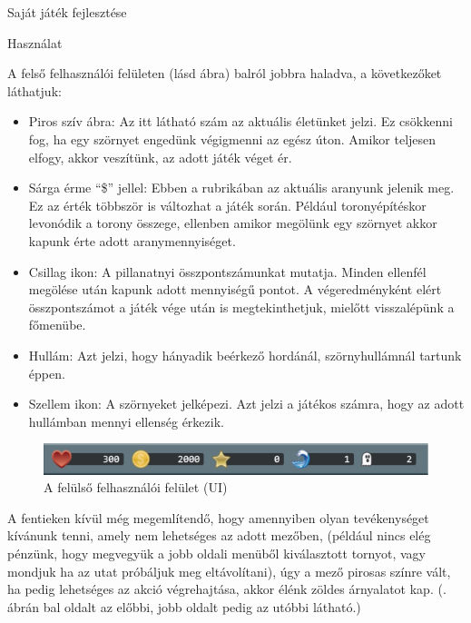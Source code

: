 \begin{MyChapter}{Saját játék fejlesztése}
\begin{MySection}{Használat}
	
		A felső felhasználói felületen (lásd  ábra) balról jobbra haladva, a következőket láthatjuk:
		
		\begin{itemize}
			\item Piros szív ábra: Az itt látható szám az aktuális életünket jelzi. Ez csökkenni fog, ha egy szörnyet engedünk végigmenni az egész úton. Amikor teljesen elfogy, akkor veszítünk, az adott játék véget ér.
			
			\item Sárga érme ``\$'' jellel: Ebben a rubrikában az aktuális aranyunk jelenik meg. Ez az érték többször is változhat a játék során. Például toronyépítéskor levonódik a torony összege, ellenben amikor megölünk egy szörnyet akkor kapunk érte adott aranymennyiséget.
			
			\item Csillag ikon: A pillanatnyi összpontszámunkat mutatja. Minden ellenfél megölése után kapunk adott mennyiségű pontot. A végeredményként elért összpontszámot a játék vége után is megtekinthetjuk, mielőtt visszalépünk a főmenübe.
			
			\item Hullám: Azt jelzi, hogy hányadik beérkező hordánál, szörnyhullámnál tartunk éppen.
			
			\item Szellem ikon: A szörnyeket jelképezi. Azt jelzi a játékos számra, hogy az adott hullámban mennyi ellenség érkezik.
		\end{itemize}
	
		\begin{figure}[H]
			\centering
			\includegraphics[scale=0.575]{kepek/jatekHasznalat/felso_ui}
			\caption{A felülső felhasználói felület (UI) }
			\label{fig:jatekHasznalat:felso_ui}
		\end{figure}
	
		A fentieken kívül még megemlítendő, hogy amennyiben olyan tevékenységet kívánunk tenni, amely nem lehetséges az adott mezőben, (például nincs elég pénzünk, hogy megvegyük a jobb oldali menüből kiválasztott tornyot, vagy mondjuk ha az utat próbáljuk meg eltávolítani), úgy a mező pirosas színre vált, ha pedig lehetséges az akció végrehajtása, akkor élénk zöldes árnyalatot kap. (. ábrán bal oldalt az előbbi, jobb oldalt pedig az utóbbi látható.)
		

\end{MySection}
\end{MyChapter}
